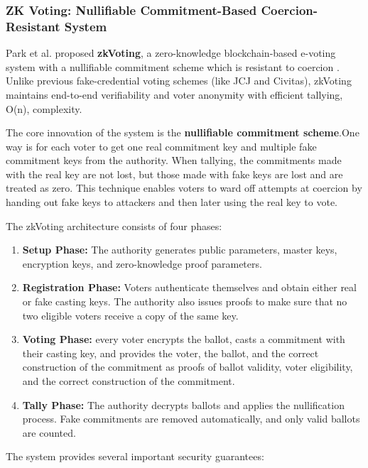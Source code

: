 \documentclass[12pt, a4paper]{report}
\begin{document}
\subsubsection{ZK Voting: Nullifiable Commitment-Based Coercion-Resistant System}

Park et al. proposed \textbf{zkVoting},  a zero-knowledge blockchain-based e-voting system with a nullifiable commitment scheme which is resistant to coercion \cite{park2024zkvoting}. Unlike previous fake-credential voting schemes (like JCJ and Civitas), zkVoting maintains end-to-end verifiability and voter anonymity with efficient tallying, O(n), complexity.

The core innovation of the system is the \textbf{nullifiable commitment scheme}.One way is for each voter to get one real commitment key and multiple fake commitment keys from the authority. When tallying, the commitments made with the real key are not lost, but those made with fake keys are lost and are treated as zero. This technique enables voters to ward off attempts at coercion by handing out fake keys to attackers and then later using the real key to vote.

The zkVoting architecture consists of four phases:

\begin{enumerate}
    \item \textbf{Setup Phase:} The authority generates public parameters, master keys, encryption keys, and zero-knowledge proof parameters.
    
    \item \textbf{Registration Phase:} Voters authenticate themselves and obtain either real or fake casting keys.  The authority also issues proofs to make sure that no two eligible voters receive a copy of the same key.
    
    \item \textbf{Voting Phase:} every voter encrypts the ballot, casts a commitment with their casting key, and provides the voter, the ballot, and the correct construction of the commitment as proofs of ballot validity, voter eligibility, and the correct construction of the commitment.
    
    \item \textbf{Tally Phase:} The authority decrypts ballots and applies the nullification process. Fake commitments are removed automatically, and only valid ballots are counted.
\end{enumerate}

The system provides several important security guarantees:
\end{document}
